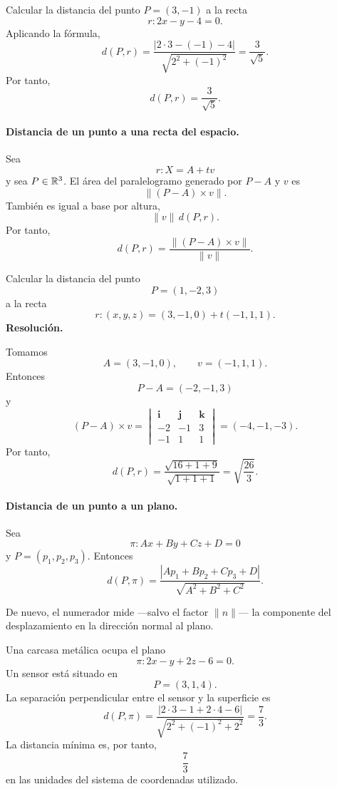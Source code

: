 \begin{example}
Calcular la distancia del punto $P=(3,-1)$ a la recta
\[
r:2x-y-4=0.
\]
Aplicando la fórmula,
\[
d(P,r)
=\frac{|2\cdot3-(-1)-4|}{\sqrt{2^2+(-1)^2}}
=\frac{3}{\sqrt5}.
\]
Por tanto,
\[
\boxed{d(P,r)=\frac{3}{\sqrt5}.}
\]
\end{example}

\paragraph{Distancia de un punto a una recta del espacio.}
Sea
\[
r:X=A+tv
\]
y sea $P\in\mathbb{R}^3$. El área del paralelogramo generado por $P-A$ y $v$ es
\[
\|(P-A)\times v\|.
\]
También es igual a base por altura,
\[
\|v\|\,d(P,r).
\]
Por tanto,
\[
\boxed{
 d(P,r)=\frac{\|(P-A)\times v\|}{\|v\|}.}
\]

\begin{solvedexercise}
Calcular la distancia del punto
\[
P=(1,-2,3)
\]
a la recta
\[
r:(x,y,z)=(3,-1,0)+t(-1,1,1).
\]
\tcblower
\textbf{Resolución.}\par\smallskip
Tomamos
\[
A=(3,-1,0),
\qquad
v=(-1,1,1).
\]
Entonces
\[
P-A=(-2,-1,3)
\]
y
\[
(P-A)\times v
=
\begin{vmatrix}
\mathbf i&\mathbf j&\mathbf k\\
-2&-1&3\\
-1&1&1
\end{vmatrix}
=(-4,-1,-3).
\]
Por tanto,
\[
d(P,r)
=\frac{\sqrt{16+1+9}}{\sqrt{1+1+1}}
=\boxed{\sqrt{\frac{26}{3}}}.
\]
\end{solvedexercise}

\paragraph{Distancia de un punto a un plano.}
Sea
\[
\pi:Ax+By+Cz+D=0
\]
y $P=(p_1,p_2,p_3)$. Entonces
\[
\boxed{
 d(P,\pi)
 =\frac{|Ap_1+Bp_2+Cp_3+D|}{\sqrt{A^2+B^2+C^2}}.}
\]

De nuevo, el numerador mide ---salvo el factor $\|n\|$--- la componente del desplazamiento en la dirección normal al plano.

\begin{example}
Una carcasa metálica ocupa el plano
\[
\pi:2x-y+2z-6=0.
\]
Un sensor está situado en
\[
P=(3,1,4).
\]
La separación perpendicular entre el sensor y la superficie es
\[
d(P,\pi)
=\frac{|2\cdot3-1+2\cdot4-6|}{\sqrt{2^2+(-1)^2+2^2}}
=\frac{7}{3}.
\]
La distancia mínima es, por tanto,
\[
\boxed{\frac73}
\]
en las unidades del sistema de coordenadas utilizado.
\end{example}

